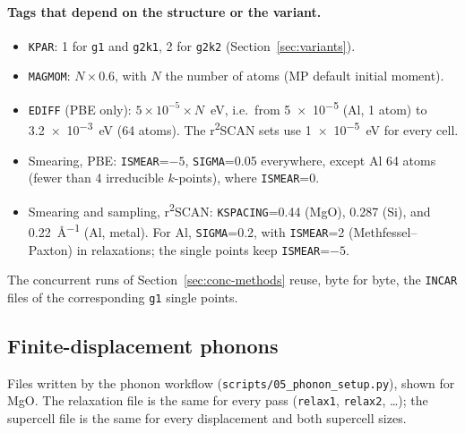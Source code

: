 \documentclass[11pt,letterpaper]{article}
\begin{document}
\paragraph{Tags that depend on the structure or the variant.}
\begin{itemize}
  \item \texttt{KPAR}: 1 for \texttt{g1} and \texttt{g2k1}, 2 for \texttt{g2k2}
        (Section~\ref{sec:variants}).
  \item \texttt{MAGMOM}: $N\times0.6$, with $N$ the number of atoms (MP default initial moment).
  \item \texttt{EDIFF} (PBE only): $5\times10^{-5}\times N$~eV, i.e.\ from \num{5e-5} (Al, 1 atom)
        to \SI{3.2e-3}{eV} (64 atoms). The r\textsuperscript{2}SCAN sets use
        \SI{1e-5}{eV} for every cell.
  \item Smearing, PBE: \texttt{ISMEAR}=$-5$, \texttt{SIGMA}=0.05 everywhere, except Al 64 atoms
        (fewer than 4 irreducible $k$-points), where \texttt{ISMEAR}=0.
  \item Smearing and sampling, r\textsuperscript{2}SCAN: \texttt{KSPACING}=0.44 (MgO), 0.287 (Si),
        and \SI{0.22}{\angstrom^{-1}} (Al, metal). For Al, \texttt{SIGMA}=0.2, with
        \texttt{ISMEAR}=2 (Methfessel--Paxton) in relaxations; the single points keep
        \texttt{ISMEAR}=$-5$.
\end{itemize}
The concurrent runs of Section~\ref{sec:conc-methods} reuse, byte for byte, the \texttt{INCAR}
files of the corresponding \texttt{g1} single points.

\subsection{Finite-displacement phonons}
\label{app:incar-phonons}
Files written by the phonon workflow (\texttt{scripts/05\_phonon\_setup.py}), shown for MgO.
The relaxation file is the same for every pass (\texttt{relax1}, \texttt{relax2}, \ldots);
the supercell file is the same for every displacement and both supercell sizes.
\end{document}
